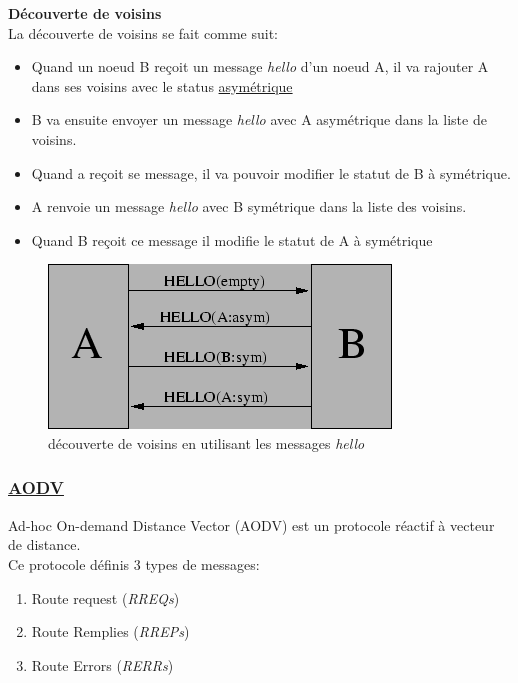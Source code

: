 \documentclass[a4paper, 12pt]{report}
\begin{document}
        \textbf{Découverte de voisins}\\
        La découverte de voisins se fait comme suit:
        \begin{itemize}
            \item Quand un noeud B reçoit un message \textit{hello} d'un noeud A,
                il va rajouter A dans ses voisins avec le status \underline{asymétrique}
            \item B va ensuite envoyer un message \textit{hello} avec A asymétrique dans la liste de voisins.
            \item Quand a reçoit se message, il va pouvoir modifier le statut de B à symétrique.
            \item A renvoie un message \textit{hello} avec B symétrique dans la liste des voisins.
            \item Quand B reçoit ce message il modifie le statut de A à symétrique
        \end{itemize}
        \begin{figure}[H]
            \centering
            \includegraphics[scale=0.6]{images/olsr_neighborDiscovery.png}
            \caption{découverte de voisins en utilisant les messages \textit{hello} \cite{olsr_neighborDiscovery_w}}
            \label{olsr_neighborDiscovery}
        \end{figure}
    
    \subsubsection{\underline{AODV}}%
        Ad-hoc On-demand Distance Vector (AODV) est un protocole réactif à vecteur de distance.\\
        Ce protocole définis 3 types de messages:
        \begin{enumerate}
            \item Route request (\textit{RREQs})
            \item Route Remplies (\textit{RREPs})
            \item Route Errors (\textit{RERRs})
        \end{enumerate}
\end{document}
